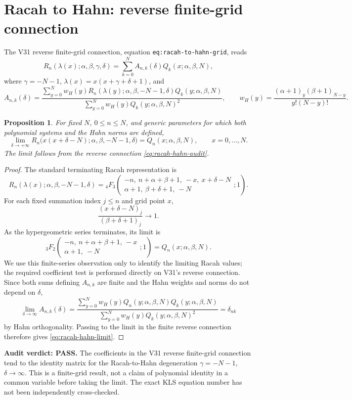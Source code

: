 \documentclass[11pt]{article}
\newtheorem{proposition}{Proposition}
\begin{document}
\section{Racah to Hahn: reverse finite-grid connection}
The V31 reverse finite-grid connection, equation
\texttt{eq:racah-to-hahn-grid}, reads
\begin{equation}\label{eq:racah-hahn-audit}
R_n(\lambda(x);\alpha,\beta,\gamma,\delta)
=\sum_{k=0}^{N} A_{n,k}(\delta)Q_k(x;\alpha,\beta,N),
\end{equation}
where $\gamma=-N-1$, $\lambda(x)=x(x+\gamma+\delta+1)$, and
\[
 A_{n,k}(\delta)=
 \frac{\sum_{y=0}^N w_H(y)
 R_n(\lambda(y);\alpha,\beta,-N-1,\delta)
 Q_k(y;\alpha,\beta,N)}
 {\sum_{y=0}^N w_H(y)Q_k(y;\alpha,\beta,N)^2},
 \qquad
 w_H(y)=\frac{(\alpha+1)_y(\beta+1)_{N-y}}{y!(N-y)!}.
\]
\begin{proposition}
For fixed $N$, $0\le n\le N$, and generic parameters for which
both polynomial systems and the Hahn norms are defined,
\begin{equation}\label{eq:racah-hahn-limit}
\lim_{\delta\to+\infty}
R_n\bigl(x(x+\delta-N);\alpha,\beta,-N-1,\delta\bigr)
=Q_n(x;\alpha,\beta,N),\qquad x=0,\ldots,N.
\end{equation}
The limit follows from the reverse connection \eqref{eq:racah-hahn-audit}.
\end{proposition}
\begin{proof}
The standard terminating Racah representation is
\[
R_n(\lambda(x);\alpha,\beta,-N-1,\delta)
={}_4F_3\!\left(\begin{matrix}-n,\ n+\alpha+\beta+1,\ -x,\ x+\delta-N\\
\alpha+1,\ \beta+\delta+1,\ -N\end{matrix};1\right).
\]
For each fixed summation index $j\le n$ and grid point $x$,
\[
\frac{(x+\delta-N)_j}{(\beta+\delta+1)_j}\longrightarrow 1.
\]
As the hypergeometric series terminates, its limit is
\[
{}_3F_2\!\left(\begin{matrix}-n,\ n+\alpha+\beta+1,\ -x\\
\alpha+1,\ -N\end{matrix};1\right)
=Q_n(x;\alpha,\beta,N).
\]
We use this finite-series observation only to identify the limiting
Racah values; the required coefficient test is performed directly on
V31's reverse connection.  Since both sums defining $A_{n,k}$ are
finite and the Hahn weights and norms do not depend on $\delta$,
\[
\lim_{\delta\to\infty}A_{n,k}(\delta)
=\frac{\sum_{y=0}^N w_H(y)Q_n(y;\alpha,\beta,N)
 Q_k(y;\alpha,\beta,N)}
 {\sum_{y=0}^N w_H(y)Q_k(y;\alpha,\beta,N)^2}
=\delta_{nk}
\]
by Hahn orthogonality.  Passing to the limit in the finite reverse
connection therefore gives \eqref{eq:racah-hahn-limit}.
\end{proof}
\noindent\textbf{Audit verdict: PASS.} The coefficients in the V31
reverse finite-grid connection tend to the identity matrix for the
Racah-to-Hahn degeneration $\gamma=-N-1$, $\delta\to\infty$.
This is a finite-grid result, not a claim of polynomial identity in a
common variable before taking the limit. The exact KLS equation number
has not been independently cross-checked.
\end{document}
